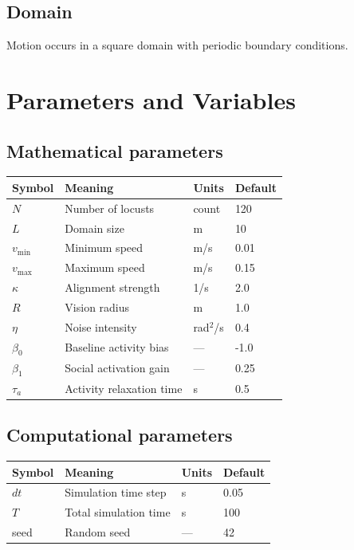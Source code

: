\documentclass[11pt,a4paper]{article}
\begin{document}
\subsection{Domain}
Motion occurs in a square domain with periodic boundary conditions.

\section{Parameters and Variables}

\subsection{Mathematical parameters}

\begin{tabular}{@{}llll@{}}
\toprule
Symbol & Meaning & Units & Default \\
\midrule
$N$ & Number of locusts & count & 120 \\
$L$ & Domain size & m & 10 \\
$v_{\min}$ & Minimum speed & m/s & 0.01 \\
$v_{\max}$ & Maximum speed & m/s & 0.15 \\
$\kappa$ & Alignment strength & 1/s & 2.0 \\
$R$ & Vision radius & m & 1.0 \\
$\eta$ & Noise intensity & rad$^2$/s & 0.4 \\
$\beta_0$ & Baseline activity bias & --- & -1.0 \\
$\beta_1$ & Social activation gain & --- & 0.25 \\
$\tau_a$ & Activity relaxation time & s & 0.5 \\
\bottomrule
\end{tabular}

\subsection{Computational parameters}

\begin{tabular}{@{}llll@{}}
\toprule
Symbol & Meaning & Units & Default \\
\midrule
$dt$ & Simulation time step & s & 0.05 \\
$T$ & Total simulation time & s & 100 \\
seed & Random seed & --- & 42 \\
\bottomrule
\end{tabular}
\end{document}

